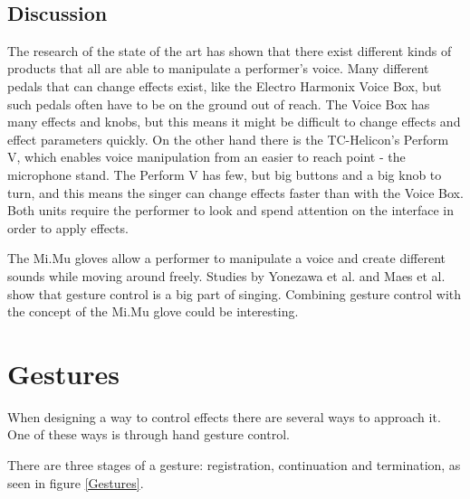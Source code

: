 \begin{minipage}{\linewidth}%
\label{One_Person_Choir}
\end{minipage}\\

\subsection{Discussion}

The research of the state of the art has shown that there exist different kinds of products that all are able to manipulate a performer's voice. Many different pedals  that can change effects exist, like the Electro Harmonix Voice Box, but such pedals often have to be on the ground out of reach\citep{VoiceBox}. The Voice Box has many effects and knobs, but this means it might be difficult to change effects and effect parameters quickly. On the other hand there is the TC-Helicon's Perform V, which enables voice manipulation from an easier to reach point - the microphone stand\citep{TC}. The Perform V has few, but big buttons and a big knob to turn, and this means the singer can change effects faster than with the Voice Box. Both units require the performer to look and spend attention on the interface in order to apply effects.

The Mi.Mu gloves allow a performer to manipulate a voice and create different sounds while moving around freely\citep{Mimu}. Studies by Yonezawa et al. and Maes et al. show that gesture control is a big part of singing\citep{Yonezawa_2005}\citep{Maes_2011}. Combining gesture control with the concept of the Mi.Mu glove could be interesting.


\section{Gestures}

When designing a way to control effects there are several ways to approach it. One of these ways is through hand gesture control.

There are three stages of a gesture: registration, continuation and termination, as seen in figure \ref{Gestures}\citep[pp. 127-134]{Wigdor_2011}.\\

\begin{minipage}{\linewidth}%
\label{Gestures}
\end{minipage}\\

